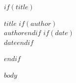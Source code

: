 \documentclass[11pt]{article}
\begin{document}
$if(title)$
\begin{center}
    {\Huge \bfseries $title$}
    $if(author)$\\[0.5em] {\large $author$}$endif$
    $if(date)$\\[0.5em] {\large $date$}$endif$
\end{center}
\vspace{1em}
$endif$

$body$
\end{document}
